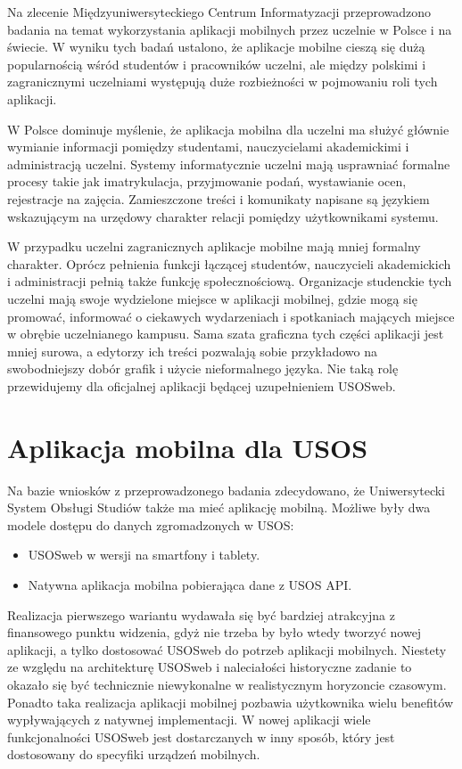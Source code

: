 \documentclass{pracamgr}
\begin{document}
Na zlecenie Międzyuniwersyteckiego Centrum Informatyzacji przeprowadzono
badania na temat wykorzystania aplikacji mobilnych przez uczelnie w
Polsce i na świecie. W wyniku tych badań ustalono, że aplikacje mobilne
cieszą się dużą popularnością wśród studentów i pracowników uczelni, ale
między polskimi i zagranicznymi uczelniami występują duże rozbieżności w
pojmowaniu roli tych aplikacji.

W Polsce dominuje myślenie, że aplikacja mobilna dla uczelni ma służyć głównie
wymianie informacji pomiędzy studentami, nauczycielami akademickimi i administracją
uczelni. Systemy informatycznie uczelni mają usprawniać formalne procesy takie jak
imatrykulacja, przyjmowanie podań, wystawianie ocen, rejestracje na zajęcia.
Zamieszczone treści i komunikaty napisane są językiem wskazującym na urzędowy
charakter relacji pomiędzy użytkownikami systemu.

W przypadku uczelni zagranicznych aplikacje mobilne mają mniej formalny
charakter. Oprócz pełnienia funkcji łączącej studentów, nauczycieli akademickich
i administracji pełnią także funkcję społecznościową. Organizacje studenckie tych
uczelni mają swoje wydzielone miejsce w aplikacji mobilnej, gdzie mogą się
promować, informować o ciekawych wydarzeniach i spotkaniach mających miejsce
w obrębie uczelnianego kampusu. Sama szata graficzna tych części aplikacji
jest mniej surowa, a edytorzy ich treści pozwalają sobie przykładowo na
swobodniejszy dobór grafik i użycie nieformalnego języka. Nie taką rolę
przewidujemy dla oficjalnej aplikacji będącej uzupełnieniem USOSweb.

\section{Aplikacja mobilna dla USOS}

Na bazie wniosków z przeprowadzonego badania zdecydowano, że Uniwersytecki
System Obsługi Studiów także ma mieć aplikację mobilną. Możliwe były dwa
modele dostępu do danych zgromadzonych w USOS:

\begin{itemize}
	\item USOSweb w wersji na smartfony i tablety.
	\item Natywna aplikacja mobilna pobierająca dane z USOS API.
\end{itemize}

Realizacja pierwszego wariantu wydawała się być bardziej atrakcyjna z finansowego
punktu widzenia, gdyż nie trzeba by było wtedy tworzyć nowej aplikacji, a tylko
dostosować USOSweb do potrzeb aplikacji mobilnych. Niestety ze względu na architekturę
USOSweb i naleciałości historyczne zadanie to okazało się być technicznie niewykonalne
w realistycznym horyzoncie czasowym. Ponadto taka realizacja aplikacji mobilnej
pozbawia użytkownika wielu benefitów wypływających z natywnej implementacji.
W nowej aplikacji wiele funkcjonalności USOSweb jest dostarczanych w inny
sposób, który jest dostosowany do specyfiki urządzeń mobilnych.
\end{document}
